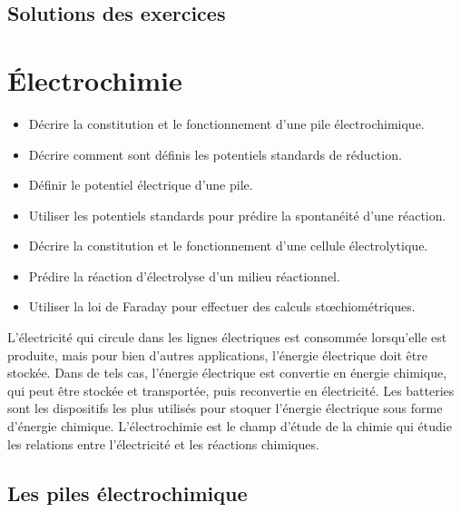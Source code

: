 \documentclass[
  11pt,
  french,
  a4paper,
  openany]{book}
\providecommand{\tightlist}{%
  \setlength{\itemsep}{0pt}\setlength{\parskip}{0pt}}
\begin{document}
\newpage

\section{Solutions des exercices} \shipoutAnswer

\hypertarget{uxe9lectrochimie}{%
\chapter{Électrochimie}\label{uxe9lectrochimie}}

\begin{objectives}

\begin{itemize}
\tightlist
\item
  Décrire la constitution et le fonctionnement d'une pile électrochimique.
\item
  Décrire comment sont définis les potentiels standards de réduction.
\item
  Définir le potentiel électrique d'une pile.
\item
  Utiliser les potentiels standards pour prédire la spontanéité d'une réaction.
\item
  Décrire la constitution et le fonctionnement d'une cellule électrolytique.
\item
  Prédire la réaction d'électrolyse d'un milieu réactionnel.
\item
  Utiliser la loi de Faraday pour effectuer des calculs stœchiométriques.
\end{itemize}


\end{objectives}

L'électricité qui circule dans les lignes électriques est consommée lorsqu'elle est produite, mais pour bien d'autres applications, l'énergie électrique doit être stockée. Dans de tels cas, l'énergie électrique est convertie en énergie chimique, qui peut être stockée et transportée, puis reconvertie en électricité. Les batteries sont les dispositifs les plus utilisés pour stoquer l'énergie électrique sous forme d'énergie chimique. L'électrochimie est le champ d'étude de la chimie qui étudie les relations entre l'électricité et les réactions chimiques.

\hypertarget{les-piles-uxe9lectrochimique}{%
\section{Les piles électrochimique}\label{les-piles-uxe9lectrochimique}}
\end{document}
